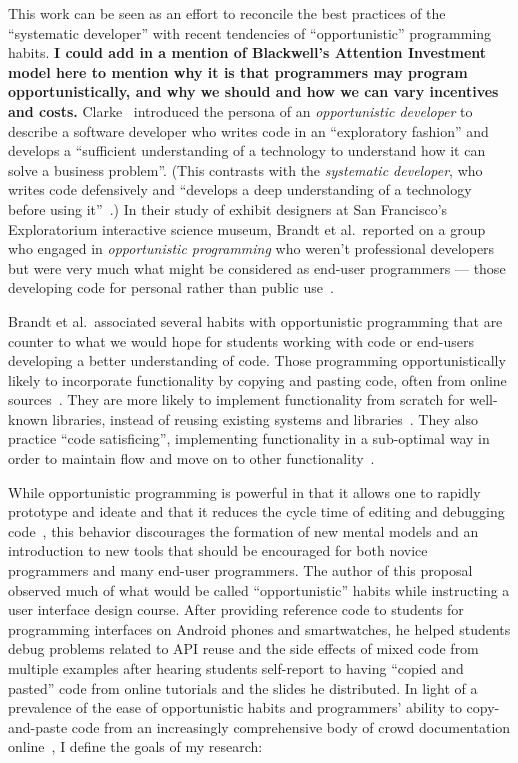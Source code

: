 \documentclass[12pt]{memoir}
\begin{document}
This work can be seen as an effort to reconcile the best practices of the ``systematic developer'' with recent tendencies of ``opportunistic'' programming habits.
\textbf{I could add in a mention of Blackwell's Attention Investment model here to mention why it is that programmers may program opportunistically, and why we should and how we can vary incentives and costs.}
Clarke~\cite{clarke_what_2007} introduced the persona of an \emph{opportunistic developer} to describe a software developer who writes code in an ``exploratory fashion'' and develops a ``sufficient understanding of a technology to understand how it can solve a business problem''.
(This contrasts with the \emph{systematic developer}, who writes code defensively and ``develops a deep understanding of a technology before using it''~\cite{clarke_what_2007}.)
In their study of exhibit designers at San Francisco's Exploratorium interactive science museum, Brandt et al.\ reported on a group who engaged in \emph{opportunistic programming} who weren't professional developers~\cite{brandt_opportunistic_2008} but were very much what might be considered as end-user programmers --- those developing code for personal rather than public use~\cite{ko_state_2011}.

Brandt et al.\ associated several habits with opportunistic programming that are counter to what we would hope for students working with code or end-users developing a better understanding of code.
Those programming opportunistically likely to incorporate functionality by copying and pasting code, often from online sources~\cite{brandt_two_2009}.
They are more likely to implement functionality from scratch for well-known libraries, instead of reusing existing systems and libraries~\cite{brandt_opportunistic_2008}.
They also practice ``code satisficing'', implementing functionality in a sub-optimal way in order to maintain flow and move on to other functionality~\cite{brandt_opportunistic_2008}.

While opportunistic programming is powerful in that it allows one to rapidly prototype and ideate and that it reduces the cycle time of editing and debugging code~\cite{brandt_opportunistic_2008}, this behavior discourages the formation of new mental models and an introduction to new tools that should be encouraged for both novice programmers and many end-user programmers.
The author of this proposal observed much of what would be called ``opportunistic'' habits while instructing a user interface design course.
After providing reference code to students for programming interfaces on Android phones and smartwatches, he helped students debug problems related to API reuse and the side effects of mixed code from multiple examples after hearing students self-report to having ``copied and pasted'' code from online tutorials and the slides he distributed.
In light of a prevalence of the ease of opportunistic habits and programmers' ability to copy-and-paste code from an increasingly comprehensive body of crowd documentation online~\cite{parnin_crowd_2012}, I define the goals of my research:
\end{document}
